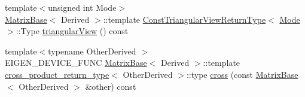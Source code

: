 \begin{DoxyCompactItemize}
\item 
{\footnotesize template$<$unsigned int Mode$>$ }\\\mbox{\hyperlink{class_eigen_1_1_matrix_base}{Matrix\+Base}}$<$ Derived $>$\+::template \mbox{\hyperlink{struct_eigen_1_1_matrix_base_1_1_const_triangular_view_return_type}{Const\+Triangular\+View\+Return\+Type}}$<$ \mbox{\hyperlink{struct_mode}{Mode}} $>$\+::Type \mbox{\hyperlink{class_eigen_1_1_matrix_base_aa044521145e74117ad1df42460d7b520}{triangular\+View}} () const
\item 
{\footnotesize template$<$typename Other\+Derived $>$ }\\E\+I\+G\+E\+N\+\_\+\+D\+E\+V\+I\+C\+E\+\_\+\+F\+U\+NC \mbox{\hyperlink{class_eigen_1_1_matrix_base}{Matrix\+Base}}$<$ Derived $>$\+::template \mbox{\hyperlink{struct_eigen_1_1_matrix_base_1_1cross__product__return__type}{cross\+\_\+product\+\_\+return\+\_\+type}}$<$ Other\+Derived $>$\+::type \mbox{\hyperlink{group___geometry___module_gacbaa31c2b67323d82aed4f1c1f68a1fc}{cross}} (const \mbox{\hyperlink{class_eigen_1_1_matrix_base}{Matrix\+Base}}$<$ Other\+Derived $>$ \&other) const
\end{DoxyCompactItemize}

